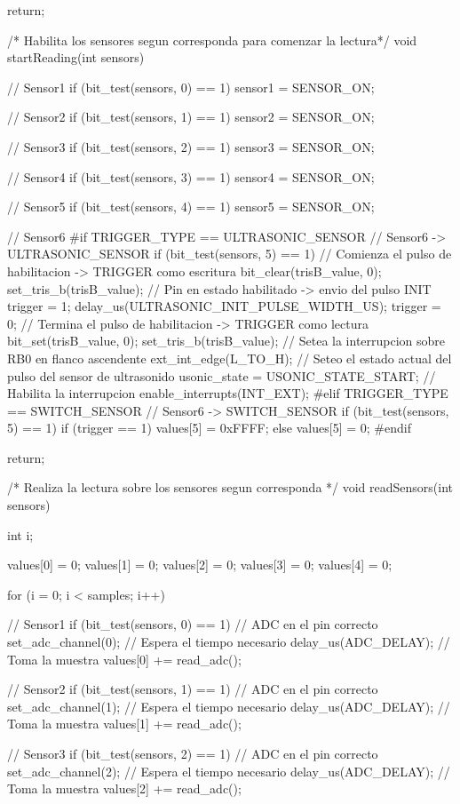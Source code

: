 {\begin{verbatimtab}
{	return;
}

/* Habilita los sensores segun corresponda para comenzar la lectura*/
void startReading(int sensors)
{
	// Sensor1
	if (bit_test(sensors, 0) == 1)
		sensor1 = SENSOR_ON;

	// Sensor2
	if (bit_test(sensors, 1) == 1)
		sensor2 = SENSOR_ON;

	// Sensor3
	if (bit_test(sensors, 2) == 1)
		sensor3 = SENSOR_ON;

	// Sensor4
	if (bit_test(sensors, 3) == 1)
		sensor4 = SENSOR_ON;

	// Sensor5
	if (bit_test(sensors, 4) == 1)
		sensor5 = SENSOR_ON;

	// Sensor6
#if TRIGGER_TYPE == ULTRASONIC_SENSOR
	// Sensor6 -> ULTRASONIC_SENSOR
	if (bit_test(sensors, 5) == 1)
	{
		// Comienza el pulso de habilitacion -> TRIGGER como escritura
		bit_clear(trisB_value, 0);
		set_tris_b(trisB_value);
		// Pin en estado habilitado -> envio del pulso INIT
		trigger = 1;
		delay_us(ULTRASONIC_INIT_PULSE_WIDTH_US);
		trigger = 0;
		// Termina el pulso de habilitacion -> TRIGGER como lectura
		bit_set(trisB_value, 0);
		set_tris_b(trisB_value);
		// Setea la interrupcion sobre RB0 en flanco ascendente
		ext_int_edge(L_TO_H);
		// Seteo el estado actual del pulso del sensor de ultrasonido
		usonic_state = USONIC_STATE_START;
		// Habilita la interrupcion
		enable_interrupts(INT_EXT);
	}
#elif TRIGGER_TYPE == SWITCH_SENSOR
	// Sensor6 -> SWITCH_SENSOR
	if (bit_test(sensors, 5) == 1)
	{
		if (trigger == 1)
			values[5] = 0xFFFF;
		else
			values[5] = 0;		
	} 
#endif

	return;
}	

/* Realiza la lectura sobre los sensores segun corresponda */
void readSensors(int sensors)
{
	int i;
	
	values[0] = 0;
	values[1] = 0;
	values[2] = 0;
	values[3] = 0;
	values[4] = 0;
	
	for (i = 0; i < samples; i++)
	{	
		// Sensor1
		if (bit_test(sensors, 0) == 1)
		{
			// ADC en el pin correcto
			set_adc_channel(0);
			// Espera el tiempo necesario
			delay_us(ADC_DELAY);
			// Toma la muestra
			values[0] += read_adc();
		}
		
		// Sensor2
		if (bit_test(sensors, 1) == 1)
		{
			// ADC en el pin correcto
			set_adc_channel(1);
			// Espera el tiempo necesario
			delay_us(ADC_DELAY);
			// Toma la muestra
			values[1] += read_adc();
		}
		
		// Sensor3
		if (bit_test(sensors, 2) == 1)
		{
			// ADC en el pin correcto
			set_adc_channel(2);
			// Espera el tiempo necesario
			delay_us(ADC_DELAY);
			// Toma la muestra
			values[2] += read_adc();
		}
		
}}
\end{verbatimtab}}
